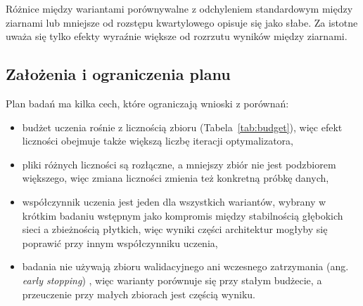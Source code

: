 Różnice między wariantami porównywalne z odchyleniem standardowym między ziarnami lub mniejsze od rozstępu kwartylowego opisuje się jako słabe. Za istotne uważa się tylko efekty wyraźnie większe od rozrzutu wyników między ziarnami.

\subsection{Założenia i ograniczenia planu}
\label{sec:methodology-caveats}

Plan badań ma kilka cech, które ograniczają wnioski z porównań:
\begin{itemize}
    \item budżet uczenia rośnie z licznością zbioru (Tabela~\ref{tab:budget}), więc efekt liczności obejmuje także większą liczbę iteracji optymalizatora,
    \item pliki różnych liczności są rozłączne, a mniejszy zbiór nie jest podzbiorem większego, więc zmiana liczności zmienia też konkretną próbkę danych,
    \item współczynnik uczenia jest jeden dla wszystkich wariantów, wybrany w krótkim badaniu wstępnym jako kompromis między stabilnością głębokich sieci a zbieżnością płytkich, więc wyniki części architektur mogłyby się poprawić przy innym współczynniku uczenia,
    \item badania nie używają zbioru walidacyjnego ani wczesnego zatrzymania (ang. \textit{early stopping}) \cite[rozdz.~7.8]{goodfellow2016}, więc warianty porównuje się przy stałym budżecie, a przeuczenie przy małych zbiorach jest częścią wyniku.
\end{itemize}
